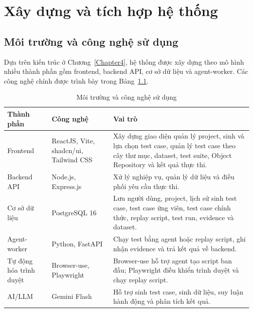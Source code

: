 
\chapter{Xây dựng và tích hợp hệ thống}
\label{Chapter5}

\section{Môi trường và công nghệ sử dụng}

Dựa trên kiến trúc ở Chương~\ref{Chapter4}, hệ thống được xây dựng theo mô hình nhiều thành phần gồm frontend, backend API, cơ sở dữ liệu và agent-worker. Các công nghệ chính được trình bày trong Bảng~\ref{tab:chapter5_tech_stack}.

\begin{table}[H]
\centering
\caption{Môi trường và công nghệ sử dụng}
\label{tab:chapter5_tech_stack}
\renewcommand{\arraystretch}{1.2}
\begin{tabular}{|p{4.0cm}|p{4.0cm}|p{6.2cm}|}
\hline
\textbf{Thành phần} &
\textbf{Công nghệ} &
\textbf{Vai trò} \\
\hline

Frontend &
ReactJS, Vite, shadcn/ui, Tailwind CSS &
Xây dựng giao diện quản lý project, sinh và lựa chọn test case, quản lý test case theo cây thư mục, dataset, test suite, Object Repository và kết quả thực thi. \\
\hline

Backend API &
Node.js, Express.js &
Xử lý nghiệp vụ, quản lý dữ liệu và điều phối yêu cầu thực thi. \\
\hline

Cơ sở dữ liệu &
PostgreSQL 16 &
Lưu người dùng, project, lịch sử sinh test case, test case ứng viên, test case chính thức, replay script, test run, evidence và dataset. \\
\hline

Agent-worker &
Python, FastAPI &
Chạy test bằng agent hoặc replay script, ghi nhận evidence và trả kết quả về backend. \\
\hline

Tự động hóa trình duyệt &
Browser-use, Playwright &
Browser-use hỗ trợ agent tạo script ban đầu; Playwright điều khiển trình duyệt và chạy replay script. \\
\hline

AI/LLM &
Gemini Flash &
Hỗ trợ sinh test case, sinh dữ liệu, suy luận hành động và phân tích kết quả. \\
\hline
\end{tabular}
\end{table}

